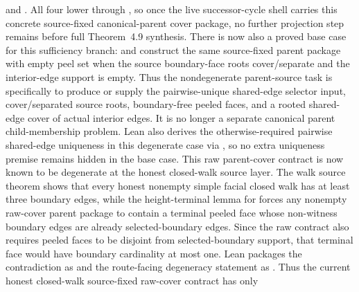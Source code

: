 \documentclass[11pt]{article}
\begin{document}
and
.
All four lower through
,
so once the live successor-cycle shell carries this concrete source-fixed
canonical-parent cover package, no further projection step remains before full
Theorem~4.9 synthesis.
There is now also a proved base case for this sufficiency branch:
and
construct the same source-fixed parent package with empty peel set when the
source boundary-face roots cover/separate and the interior-edge support is
empty.  Thus the nondegenerate parent-source task is specifically to produce
or supply the pairwise-unique shared-edge selector input, cover/separated
source roots, boundary-free peeled faces, and a rooted shared-edge cover of
actual interior edges.  It is no longer a separate canonical parent
child-membership problem.  Lean also derives the otherwise-required
pairwise shared-edge uniqueness in this degenerate case via
, so no
extra uniqueness premise remains hidden in the base case.
This raw parent-cover contract is now known to be degenerate at the honest
closed-walk source layer.  The walk source theorem
shows that every honest nonempty simple facial closed walk has at least three
boundary edges, while the height-terminal lemma for
 forces any nonempty
raw-cover parent package to contain a terminal peeled face whose non-witness
boundary edges are already selected-boundary edges.  Since the raw contract
also requires peeled faces to be disjoint from selected-boundary support, that
terminal face would have boundary cardinality at most one.  Lean packages the
contradiction as
and the route-facing degeneracy statement as
.
Thus the current honest closed-walk source-fixed raw-cover contract has only
\end{document}
